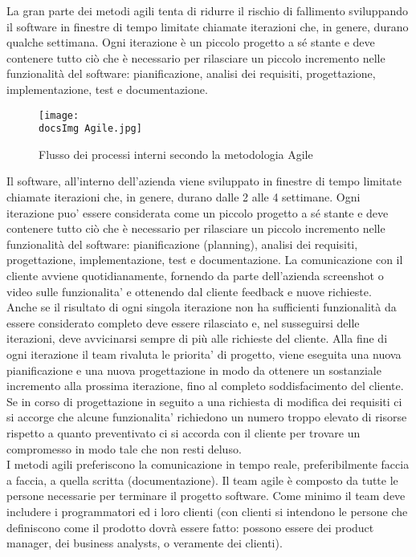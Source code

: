 La gran parte dei metodi agili tenta di ridurre il rischio di fallimento sviluppando il software in finestre di tempo limitate chiamate iterazioni che, in genere, durano qualche settimana. Ogni iterazione è un piccolo progetto a sé stante e deve contenere tutto ciò che è necessario per rilasciare un piccolo incremento nelle funzionalità del software: pianificazione, analisi dei requisiti, progettazione, implementazione, test e documentazione.
\\

\begin{figure}[H]
	\centering
	\texttt{[image: \\docsImg Agile.jpg]}
	\caption{Flusso dei processi interni secondo la metodologia Agile}
	\label{fig:Flusso dei processi interni}
\end{figure}

Il software, all'interno dell'azienda viene sviluppato in finestre di tempo limitate chiamate iterazioni che, in genere, durano dalle 2 alle 4 settimane. Ogni iterazione puo' essere considerata come un piccolo progetto a sé stante e deve contenere tutto ciò che è necessario per rilasciare un piccolo incremento nelle funzionalità del software: pianificazione (planning), analisi dei requisiti, progettazione, implementazione, test e documentazione. La comunicazione con il cliente avviene quotidianamente, fornendo da parte dell'azienda screenshot o video sulle funzionalita' e ottenendo dal cliente feedback e nuove richieste.
\\
Anche se il risultato di ogni singola iterazione non ha sufficienti funzionalità da essere considerato completo deve essere rilasciato e, nel susseguirsi delle iterazioni, deve avvicinarsi sempre di più alle richieste del cliente. Alla fine di ogni iterazione il team rivaluta le priorita' di progetto, viene eseguita una nuova pianificazione e una nuova progettazione in modo da ottenere un sostanziale incremento alla prossima iterazione, fino al completo soddisfacimento del cliente. Se in corso di progettazione in seguito a una richiesta di modifica dei requisiti ci si accorge che alcune funzionalita' richiedono un numero troppo elevato di risorse rispetto a quanto preventivato ci si accorda con il cliente per trovare un compromesso in modo tale che non resti deluso.
\\
I metodi agili preferiscono la comunicazione in tempo reale, preferibilmente faccia a faccia, a quella scritta (documentazione). Il team agile è composto da tutte le persone necessarie per terminare il progetto software. Come minimo il team deve includere i programmatori ed i loro clienti (con clienti si intendono le persone che definiscono come il prodotto dovrà essere fatto: possono essere dei product manager, dei business analysts, o veramente dei clienti).

